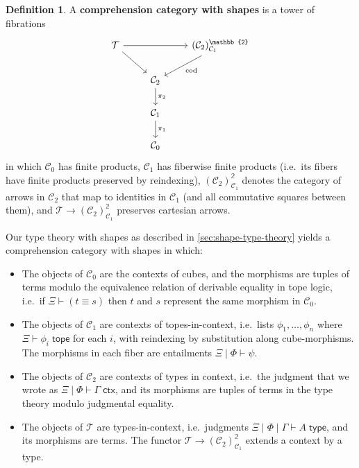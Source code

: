 \documentclass[12pt]{amsart}
\theoremstyle{plain}
\theoremstyle{definition}
\newtheorem{defn}[thm]{Definition}
\theoremstyle{remark}
\numberwithin{equation}{section}
\newcommand{\jdeq}{\equiv}
\newcommand{\types}{\vdash}
\newcommand{\type}{\;\mathsf{type}}
\newcommand{\tope}{\;\mathsf{tope}}
\newcommand{\ctx}{\;\mathsf{ctx}}
\newcommand{\two}{\mathbb{2}}
\newcommand{\C}{\mathcal{C}}
\newcommand{\T}{\mathcal{T}}
\begin{document}
\begin{defn}
  A \textbf{comprehension category with shapes} is a tower of fibrations
  \[
  \begin{tikzcd}
    \T \ar[rr] \ar[dr] && (\C_2)^\two_{\C_1} \ar[dl,"\mathrm{cod}"] \\ &\C_2 \ar[d, "\pi_2"]\\ & \C_1 \ar[d,"\pi_1"] \\ & \C_0
  \end{tikzcd}
  \]
  in which $\C_0$ has finite products, $\C_1$ has fiberwise finite products (i.e.\ its fibers have finite products preserved by reindexing), $(\C_2)^\two_{\C_1}$ denotes the category of arrows in $\C_2$ that map to identities in $\C_1$ (and all commutative squares between them), and $\T\to(\C_2)^\two_{\C_1}$ preserves cartesian arrows.
\end{defn}

Our type theory with shapes as described in \cref{sec:shape-type-theory} yields a comprehension category with shapes in which:
\begin{itemize}
\item The objects of $\C_0$ are the contexts of cubes, and the morphisms are tuples of terms modulo the equivalence relation of derivable equality in tope logic, i.e.\ if $\Xi\types (t\jdeq s)$ then $t$ and $s$ represent the same morphism in $\C_0$.
\item The objects of $\C_1$ are contexts of topes-in-context, i.e.\ lists $\phi_1,\dots,\phi_n$ where $\Xi\types \phi_i\tope$ for each $i$, with reindexing by substitution along cube-morphisms.
  The morphisms in each fiber are entailments $\Xi\mid\Phi\types\psi$.
\item The objects of $\C_2$ are contexts of types in context, i.e.\ the judgment that we wrote as $\Xi\mid\Phi\types \Gamma\ctx$, and its morphisms are tuples of terms in the type theory modulo judgmental equality.
\item The objects of $\T$ are types-in-context, i.e.\ judgments $\Xi\mid\Phi\mid\Gamma\types A\type$, and its morphisms are terms.
  The functor $\T \to (\C_2)^\two_{\C_1}$ extends a context by a type.
\end{itemize}
\end{document}

